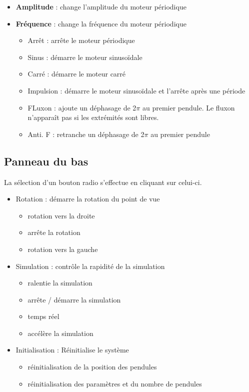 \begin{itemize}[leftmargin=1cm, label=, itemsep=0pt]
\begin{itemize}[leftmargin=1cm, label=, itemsep=0pt]
	\end{itemize}
	\item {\bf Amplitude} : change l'amplitude du moteur périodique
	\item {\bf Fréquence} : change la fréquence du moteur périodique
	\begin{itemize}[leftmargin=1cm, label=, itemsep=0pt]
		\item Arrêt : arrête le moteur périodique
		\item Sinus : démarre le moteur sinusoïdale
		\item Carré : démarre le moteur carré
		\item Impulsion : démarre le moteur sinusoïdale et l'arrête après une période
	\end{itemize}
	\begin{itemize}[leftmargin=1cm, label=, itemsep=0pt]
		\item FLuxon : ajoute un déphasage de 2$\pi$ au premier pendule. Le fluxon n'apparaît pas si les extrémités sont libres.
		\item Anti. F : retranche un déphasage de 2$\pi$ au premier pendule
	\end{itemize}
\end{itemize}
%
%
\subsection{Panneau du bas}
%
La sélection d'un bouton radio s'effectue en cliquant sur celui-ci. 
%
%
\begin{itemize}[leftmargin=1cm, label=, itemsep=0pt]
	\item Rotation : démarre la rotation du point de vue
	\begin{itemize}[leftmargin=1cm, label=, itemsep=0pt]
		\item rotation vers la droite
		\item arrête la rotation
		\item rotation vers la gauche
	\end{itemize}
	\item Simulation : contrôle la rapidité de la simulation
	\begin{itemize}[leftmargin=1cm, label=, itemsep=0pt]
		\item ralentie la simulation
		\item arrête / démarre la simulation
		\item temps réel
		\item accélère la simulation
	\end{itemize}
	\item Initialisation : Réinitialise le système
	\begin{itemize}[leftmargin=1cm, label=, itemsep=0pt]
		\item réinitialisation de la position des pendules
		\item réinitialisation des paramètres et du nombre de pendules
	\end{itemize}
\end{itemize}
%
